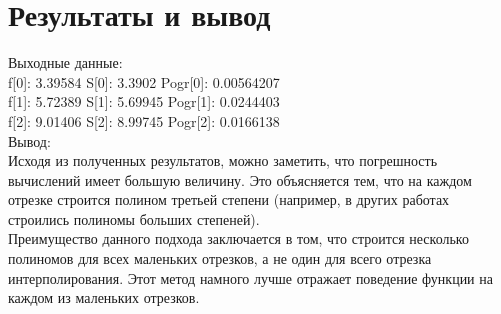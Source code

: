 \documentclass[10pt]{scrartcl}
\begin{document}
\section*{Результаты и вывод}\noindent
Выходные данные:\\
f[0]: 3.39584 S[0]: 3.3902 Pogr[0]: 0.00564207\\
f[1]: 5.72389 S[1]: 5.69945 Pogr[1]: 0.0244403\\
f[2]: 9.01406 S[2]: 8.99745 Pogr[2]: 0.0166138\\
Вывод:\\
Исходя из полученных результатов, можно заметить, что погрешность вычислений имеет большую величину. Это объясняется тем, что на каждом отрезке строится полином третьей степени (например, в других работах строились полиномы больших степеней).\\
Преимущество данного подхода заключается в том, что строится несколько полиномов для всех маленьких отрезков, а не один для всего отрезка интерполирования. Этот метод намного лучше отражает поведение функции на каждом из 
маленьких отрезков.
\end{document}
